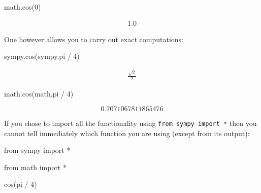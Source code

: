 \begin{pyin}
\begin{pyin}
math.cos(0)
\end{pyin}





\begin{equation*}
\begin{split}\displaystyle 1.0\end{split}
\end{equation*}





One however allows you to carry out exact computations:




\begin{pyin}
sympy.cos(sympy.pi / 4)
\end{pyin}




\begin{equation*}
\begin{split}\displaystyle \frac{\sqrt{2}}{2}\end{split}
\end{equation*}






\begin{pyin}
math.cos(math.pi / 4)
\end{pyin}





\[
0.7071067811865476
\]





If you chose to import all the functionality using \texttt{from sympy import *}
then you
cannot tell immediately which function you are using (except from its output):




\begin{pyin}
from sympy import *
\end{pyin}







\begin{pyin}
from math import *
\end{pyin}







\begin{pyin}
cos(pi / 4)
\end{pyin}






\end{pyin}
